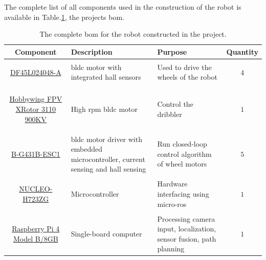 The complete list of all components used in the construction of the robot is available in Table.\:\ref{tab:bom}, the projects \ac{bom}.
\begin{table}[H]
	\centering
	\caption{The complete \ac{bom} for the robot constructed in the project.}
	\label{tab:bom}
	\begin{tabularx}{\textwidth}{|c|X|X|c|} \hline
		\rowcolor{light_grey} \textbf{Component}                                                                                                            & \textbf{Description}                                                                    & \textbf{Purpose}                                                                    & \textbf{Quantity} \\ \hline
		\hypertarget{bom:DF45L024048-A}{\href{https://www.nanotec.com/fileadmin/files/Datenblaetter/BLDC/DF45/DF45L024048-A.pdf?1656012533}{DF45L024048-A}} & \acs{bldc} motor with integrated hall sensors                                           & Used to drive the wheels of the robot                                               & $4$               \\ \hline
		\hypertarget{bom:Hobbywing_xrotor}{\href{https://www.hobbywing.com/en/products/xrotor3110}{Hobbywing FPV XRotor 3110 900KV}}                        & High \acs{rpm} \acs{bldc} motor                                                         & Control the dribbler                                                                & $1$               \\ \hline
		\hypertarget{bom:B-G431B-ESC1}{\href{https://www.mouser.se/datasheet/2/389/b-g431b-esc1-1848063.pdf}{B-G431B-ESC1}}                                 & \acs{bldc} motor driver with embedded microcontroller, current sensing and hall sensing & Run closed-loop control algorithm of wheel motors                                   & $5$               \\ \hline
		\hypertarget{bom:NUCLEO-H723ZG}{\href{https://www.st.com/en/evaluation-tools/nucleo-h723zg.html}{NUCLEO-H723ZG}}                                    & Microcontroller                                                                         & Hardware interfacing using \acs{micro-ros}                                          & $1$               \\ \hline
		\href{https://datasheets.raspberrypi.com/rpi4/raspberry-pi-4-datasheet.pdf}{Raspberry Pi 4 Model B/8GB}                                             & Single-board computer                                                                   & Processing camera input, localization, sensor fusion, path planning                 & $1$               \\ \hline

\end{tabularx}
\end{table}
